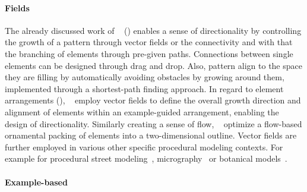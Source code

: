 \paragraph*{Fields}
The already discussed work of \citeauthor*{gieseke_2017_ooo}~\cite{gieseke_2017_ooo} () enables a sense of directionality by controlling the growth of a pattern through vector fields or the connectivity and with that the branching of elements through pre-given paths. Connections between single elements can be designed through drag and drop. Also, pattern align to the space they are filling by automatically avoiding obstacles by growing around them, implemented through a shortest-path finding approach. In regard to element arrangements (), \citeauthor*{ijiri_2008_aeb}~\cite{ijiri_2008_aeb} employ vector fields to define the overall growth direction and alignment of elements within an example-guided arrangement, enabling the design of directionality. Similarly creating a sense of flow, \citeauthor*{saputra_2017_ffo}~\cite{saputra_2017_ffo} optimize a flow-based ornamental packing of elements into a two-dimensional outline. Vector fields are further employed in various other specific procedural modeling contexts. For example for procedural street modeling~\cite{chen_2008_ips}, micrography~\cite{maharik_2011_dm} or botanical models~\cite{xu_2015_ptm}.

\paragraph*{Example-based}

